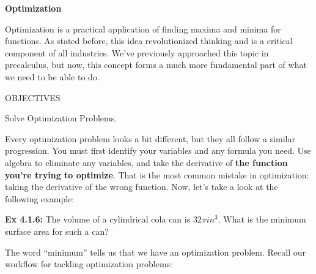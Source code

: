 \bigskip

\textbf{\large{Optimization}} \par

Optimization is a practical application of finding maxima and minima for functions. As stated before, this idea revolutionized thinking and is a critical component of all industries. We've previously approached this topic in precalculus, but now, this concept forms a much more fundamental part of what we need to be able to do. \par

\begin{tcolorbox}
    \begin{center}
        OBJECTIVES \\[11pt]
    \end{center}
    Solve Optimization Problems.
\end{tcolorbox}

Every optimization problem looks a bit different, but they all follow a similar progression. You must first identify your variables and any formula you need. Use algebra to eliminate any variables, and take the derivative of \textbf{the function you're trying to optimize}. That is the most common mistake in optimization: taking the derivative of the wrong function. Now, let's take a look at the following example:

\begin{tcolorbox}[example]
    \textbf{Ex 4.1.6: } The volume of a cylindrical cola can is $32\pi \si{in^3}$. What is the minimum surface area for such a can?
\end{tcolorbox}

The word ``minimum'' tells us that we have an optimization problem. Recall our workflow for tackling optimization problems:

